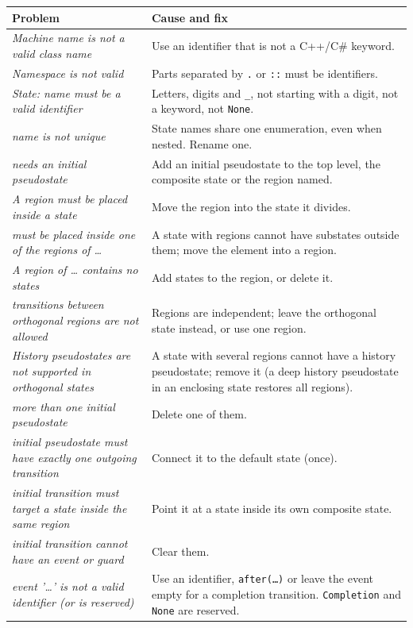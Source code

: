 \documentclass[11pt,a4paper,openany]{report}
\newcommand{\code}[1]{\texttt{#1}}
\begin{document}
\begin{longtable}{@{}p{6.3cm}p{8.1cm}@{}}
\toprule
\textbf{Problem} & \textbf{Cause and fix} \\
\midrule
\endhead
\emph{Machine name is not a valid class name} & Use an identifier that is not a C++/C\# keyword. \\
\emph{Namespace is not valid} & Parts separated by \code{.} or \code{::} must be identifiers. \\
\emph{State: name must be a valid identifier} & Letters, digits and \code{\_}, not starting with a digit, not a keyword, not \code{None}. \\
\emph{name is not unique} & State names share one enumeration, even when nested. Rename one. \\
\emph{needs an initial pseudostate} & Add an initial pseudostate to the top level, the composite state or the region named. \\
\emph{A region must be placed inside a state} & Move the region into the state it divides. \\
\emph{must be placed inside one of the regions of \dots} & A state with regions cannot have substates outside them; move the element into a region. \\
\emph{A region of \dots{} contains no states} & Add states to the region, or delete it. \\
\emph{transitions between orthogonal regions are not allowed} & Regions are independent; leave the orthogonal state instead, or use one region. \\
\emph{History pseudostates are not supported in orthogonal states} & A state with several regions cannot have a history pseudostate; remove it (a deep history pseudostate in an enclosing state restores all regions). \\
\emph{more than one initial pseudostate} & Delete one of them. \\
\emph{initial pseudostate must have exactly one outgoing transition} & Connect it to the default state (once). \\
\emph{initial transition must target a state inside the same region} & Point it at a state inside its own composite state. \\
\emph{initial transition cannot have an event or guard} & Clear them. \\
\emph{event '\dots' is not a valid identifier (or is reserved)} & Use an identifier, \code{after(\dots)} or leave the event empty for a completion transition. \code{Completion} and \code{None} are reserved. \\

\end{longtable}
\end{document}
